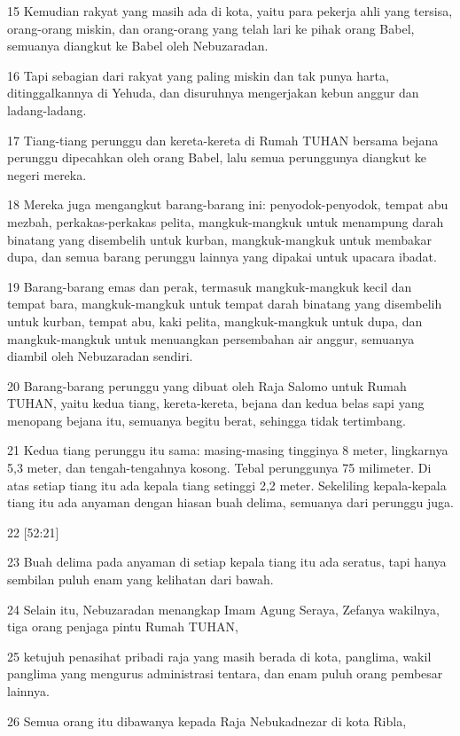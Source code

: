\par 15 Kemudian rakyat yang masih ada di kota, yaitu para pekerja ahli yang tersisa, orang-orang miskin, dan orang-orang yang telah lari ke pihak orang Babel, semuanya diangkut ke Babel oleh Nebuzaradan.
\par 16 Tapi sebagian dari rakyat yang paling miskin dan tak punya harta, ditinggalkannya di Yehuda, dan disuruhnya mengerjakan kebun anggur dan ladang-ladang.
\par 17 Tiang-tiang perunggu dan kereta-kereta di Rumah TUHAN bersama bejana perunggu dipecahkan oleh orang Babel, lalu semua perunggunya diangkut ke negeri mereka.
\par 18 Mereka juga mengangkut barang-barang ini: penyodok-penyodok, tempat abu mezbah, perkakas-perkakas pelita, mangkuk-mangkuk untuk menampung darah binatang yang disembelih untuk kurban, mangkuk-mangkuk untuk membakar dupa, dan semua barang perunggu lainnya yang dipakai untuk upacara ibadat.
\par 19 Barang-barang emas dan perak, termasuk mangkuk-mangkuk kecil dan tempat bara, mangkuk-mangkuk untuk tempat darah binatang yang disembelih untuk kurban, tempat abu, kaki pelita, mangkuk-mangkuk untuk dupa, dan mangkuk-mangkuk untuk menuangkan persembahan air anggur, semuanya diambil oleh Nebuzaradan sendiri.
\par 20 Barang-barang perunggu yang dibuat oleh Raja Salomo untuk Rumah TUHAN, yaitu kedua tiang, kereta-kereta, bejana dan kedua belas sapi yang menopang bejana itu, semuanya begitu berat, sehingga tidak tertimbang.
\par 21 Kedua tiang perunggu itu sama: masing-masing tingginya 8 meter, lingkarnya 5,3 meter, dan tengah-tengahnya kosong. Tebal perunggunya 75 milimeter. Di atas setiap tiang itu ada kepala tiang setinggi 2,2 meter. Sekeliling kepala-kepala tiang itu ada anyaman dengan hiasan buah delima, semuanya dari perunggu juga.
\par 22 [52:21]
\par 23 Buah delima pada anyaman di setiap kepala tiang itu ada seratus, tapi hanya sembilan puluh enam yang kelihatan dari bawah.
\par 24 Selain itu, Nebuzaradan menangkap Imam Agung Seraya, Zefanya wakilnya, tiga orang penjaga pintu Rumah TUHAN,
\par 25 ketujuh penasihat pribadi raja yang masih berada di kota, panglima, wakil panglima yang mengurus administrasi tentara, dan enam puluh orang pembesar lainnya.
\par 26 Semua orang itu dibawanya kepada Raja Nebukadnezar di kota Ribla,
